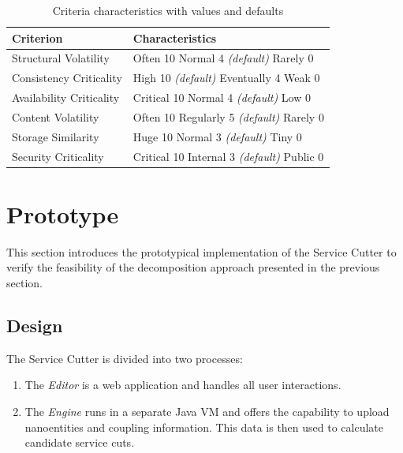 \begin{table}[H]
	\centering
	\caption{Criteria characteristics with values and defaults}
	\label{tab:characteristics}
	\begin{tabular}{|p{100pt}|p{150pt}|}
		\hline	
		\textbf{Criterion} & \textbf{Characteristics} \\
		\hline
		Structural Volatility & Often 10 \newline Normal 4 \textit{(default)} \newline Rarely 0 \\
		\hline
		Consistency Criticality & High 10 \textit{(default)} \newline Eventually 4 \newline Weak 0 \\
		\hline
		Availability Criticality & Critical 10 \newline Normal 4 \textit{(default)} \newline Low 0 \\
		\hline
		Content Volatility & Often 10 \newline Regularly 5 \textit{(default)} \newline Rarely 0 \\
		\hline
		Storage Similarity & Huge 10 \newline Normal 3 \textit{(default)} \newline Tiny 0 \\
		\hline
		Security Criticality & Critical 10 \newline Internal 3 \textit{(default)} \newline Public 0 \\
		\hline
	\end{tabular}
\end{table}


\section{Prototype} 

This section introduces the prototypical implementation of the Service Cutter to verify the feasibility of the decomposition approach presented in the previous section.

\subsection{Design}

The Service Cutter is divided into two processes:

\begin{enumerate}
	\item The \textit{Editor} is a web application and handles all user interactions.
	\item The \textit{Engine} runs in a separate Java \gls{VM} and offers the capability to upload nanoentities and coupling information. This data is then used to calculate candidate service cuts.
\end{enumerate}

